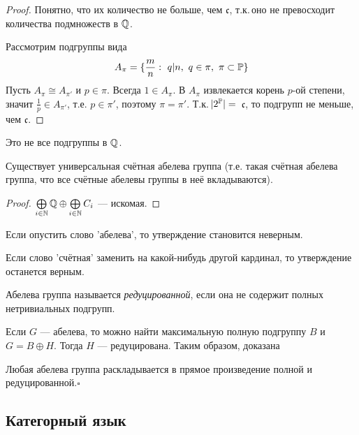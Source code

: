 \documentclass[10pt,a4paper]{article}
\begin{document}
\begin{proof} Понятно, что их количество не больше, чем $\mathfrak{c}$,
т.к.\,оно не превосходит количества подмножеств в $\mathbb Q$.

Рассмотрим подгруппы вида
$$
A_\pi=\{\frac{m}{n}:~q|n,~q\in\pi,~\pi\subset \mathbb P\}
$$
Пусть $A_\pi\cong A_{\pi'}$ и $p\in\pi$. Всегда $1\in A_\pi$. В
$A_\pi$ извлекается корень $p$-ой степени, значит $\frac{1}{p}\in
A_{\pi'}$, т.е. $p\in\pi'$, поэтому $\pi=\pi'$. Т.к.\,$|2^\mathbb P|=\,$
$\mathfrak{c}$, то подгрупп не меньше, чем
$\mathfrak{c}$.\end{proof}

\begin{note}
Это не все подгруппы в $\mathbb Q$.
\end{note}

\begin{theorem}Существует
универсальная счётная абелева группа (т.е. такая счётная абелева группа, что все
счётные абелевы группы в неё вкладываются).
\end{theorem}

\begin{proof}
$\bigoplus\limits_{i\in\mathbb N}\mathbb Q\oplus\bigoplus\limits_{i\in\mathbb N}C_i$
--- искомая.\end{proof}

\begin{note}
Если опустить слово 'абелева', то утверждение становится неверным.
\end{note}

\begin{note}
Если слово 'счётная' заменить на какой-нибудь другой кардинал, то
утверждение останется верным.
\end{note}

Абелева группа называется {\em
редуцированной}, если она не
содержит полных нетривиальных подгрупп.

Если $G$ --- абелева, то можно найти максимальную полную подгруппу
$B$ и $G=B\oplus H$. Тогда $H$ --- редуцирована. Таким образом,
доказана

\begin{theorem}Любая абелева группа раскладывается в
прямое произведение полной и редуцированной.$\square$
\end{theorem}

\subsection{Категорный язык}
\end{document}
